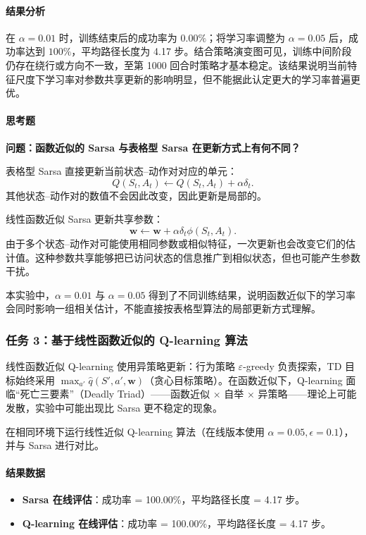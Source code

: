 \documentclass[11pt,a4paper,UTF8]{ctexart}
\numberwithin{figure}{section}
\numberwithin{table}{section}
\newcommand{\answerlabel}{%
  \par\smallskip\noindent{\heiti\bfseries 回答：}\quad}
\newcommand{\question}[1]{\par\smallskip\noindent\textbf{#1}\par}
\begin{document}
\paragraph{结果分析}
在 $\alpha=0.01$ 时，训练结束后的成功率为 $0.00\%$；将学习率调整为 $\alpha=0.05$ 后，成功率达到 $100\%$，平均路径长度为 4.17 步。结合策略演变图可见，训练中间阶段仍存在绕行或方向不一致，至第 1000 回合时策略才基本稳定。该结果说明当前特征尺度下学习率对参数共享更新的影响明显，但不能据此认定更大的学习率普遍更优。

\paragraph{思考题}



\question{问题：函数近似的 Sarsa 与表格型 Sarsa 在更新方式上有何不同？}

\answerlabel 表格型 Sarsa 直接更新当前状态--动作对对应的单元：
\[
Q(S_t,A_t)\leftarrow Q(S_t,A_t)+\alpha\delta_t.
\]
其他状态--动作对的数值不会因此改变，因此更新是局部的。

线性函数近似 Sarsa 更新共享参数：
\[
\mathbf w\leftarrow \mathbf w+\alpha\delta_t\phi(S_t,A_t).
\]
由于多个状态--动作对可能使用相同参数或相似特征，一次更新也会改变它们的估计值。这种参数共享能够把已访问状态的信息推广到相似状态，但也可能产生参数干扰。

本实验中，$\alpha=0.01$ 与 $\alpha=0.05$ 得到了不同训练结果，说明函数近似下的学习率会同时影响一组相关估计，不能直接按表格型算法的局部更新方式理解。


\subsubsection{任务 3：基于线性函数近似的 Q-learning 算法}

线性函数近似 Q-learning 使用异策略更新：行为策略 $\varepsilon$-greedy 负责探索，TD 目标始终采用 $\max_{a'} \hat{q}(S', a', \mathbf{w})$（贪心目标策略）。在函数近似下，Q-learning 面临``死亡三要素''（Deadly Triad）——函数近似 $\times$ 自举 $\times$ 异策略——理论上可能发散，实验中可能出现比 Sarsa 更不稳定的现象。

在相同环境下运行线性近似 Q-learning 算法（在线版本使用 $\alpha=0.05, \epsilon=0.1$），并与 Sarsa 进行对比。

\paragraph{结果数据}
\begin{itemize}
\item \textbf{Sarsa 在线评估}：成功率 = 100.00\%，平均路径长度 = 4.17 步。
\item \textbf{Q-learning 在线评估}：成功率 = 100.00\%，平均路径长度 = 4.17 步。
\end{itemize}
\end{document}
